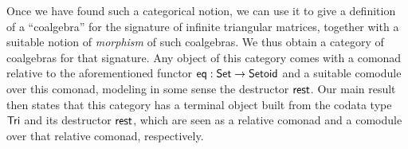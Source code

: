 \documentclass{llncs}
\newcommand{\fat}[1]{\textbf{#1}}
\begin{document}
  Once we have found such a categorical notion, we can use 
  it to give a definition of a \enquote{coalgebra} for the signature of infinite triangular matrices, 
  together with a suitable notion of \emph{morphism} of such coalgebras.
   We thus obtain a category of coalgebras for that signature.
  Any object of this category comes with a comonad relative to the aforementioned functor $\mathsf{eq} : \mathsf{Set}\to\mathsf{Setoid}$
  and a suitable comodule over this comonad, modeling in some sense the destructor $\mathsf{rest}$.
  Our main result then states that this category 
  has a terminal object built from the codata type $\mathsf{Tri}$ and its destructor $\mathsf{rest}$,
  which are seen as a relative comonad and a comodule over that relative comonad, respectively.
% 
% 
% 
% 
% 
% 
% 
% 
\end{document}
